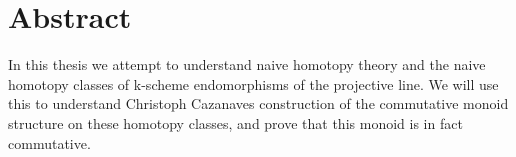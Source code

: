 \section*{Abstract}
In this thesis we attempt to understand naive homotopy theory and the naive homotopy classes of k-scheme endomorphisms of the projective line. We will use this to understand Christoph Cazanaves construction of the commutative monoid structure on these homotopy classes, and prove that this monoid is in fact commutative.  
